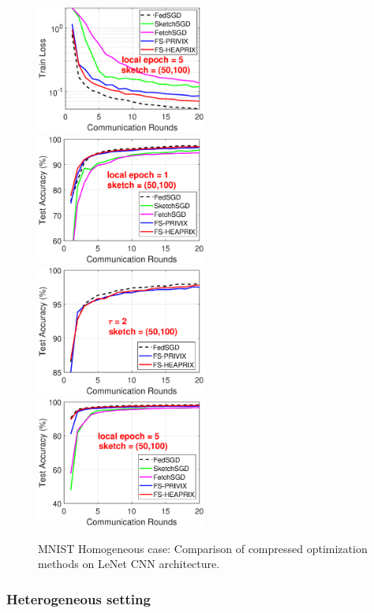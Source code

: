 \documentclass[11pt]{article}
\begin{document}
\begin{figure}[h]
\begin{center}
{		\includegraphics[width=2.2in]{MNIST_figures/local5_sketch50_iid1_train_loss.eps}}
		\mbox{%
		\includegraphics[width=2.2in]{MNIST_figures/local1_sketch50_iid1_test_acc.eps}%
		\includegraphics[width=2.2in]{MNIST_figures/local2_sketch50_iid1_test_acc.eps} %
		\includegraphics[width=2.2in]{MNIST_figures/local5_sketch50_iid1_test_acc.eps}
		}
	\end{center}
	\caption{MNIST Homogeneous case: Comparison of compressed optimization methods on LeNet CNN architecture.}
    \label{fig:MNIST-iid1-app}
\end{figure}

\subsubsection{Heterogeneous setting}
\end{document}
